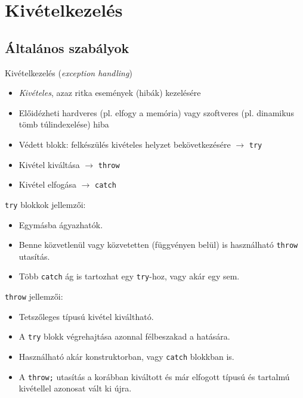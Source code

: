 \documentclass[usenames,dvipsnames,aspectratio=169]{beamer}
\begin{document}
\begin{frame}
    \begin{exampleblock}{}
        
    \end{exampleblock}
\end{frame}

\section{Kivételkezelés}

\subsection{Általános szabályok}

\begin{frame}
    Kivételkezelés (\emph{exception handling})
    \begin{itemize}
        \item \emph{Kivételes}, azaz ritka események (hibák) kezelésére
        \item Előidézheti hardveres (pl. elfogy a memória) vagy szoftveres (pl. dinamikus tömb túlindexelése) hiba
        \item Védett blokk: felkészülés kivételes helyzet bekövetkezésére $\to$ \texttt{try}
        \item Kivétel kiváltása $\to$ \texttt{throw}
        \item Kivétel elfogása $\to$ \texttt{catch}
    \end{itemize}
\end{frame}

\begin{frame}
    \texttt{try} blokkok jellemzői:
    \begin{itemize}
        \item Egymásba ágyazhatók.
        \item Benne közvetlenül vagy közvetetten (függvényen belül) is használható \texttt{throw} utasítás.
        \item Több \texttt{catch} ág is tartozhat egy \texttt{try}-hoz, vagy akár egy sem.
    \end{itemize}
    \vfill
    \texttt{throw} jellemzői:
    \begin{itemize}
        \item Tetszőleges típusú kivétel kiváltható.
        \item A \texttt{try} blokk végrehajtása azonnal félbeszakad a hatására.
        \item Használható akár konstruktorban, vagy \texttt{catch} blokkban is.
        \item A \texttt{throw;} utasítás a korábban kiváltott és már elfogott típusú és tartalmú kivétellel azonosat vált ki újra.
    \end{itemize}
\end{frame}
\end{document}
